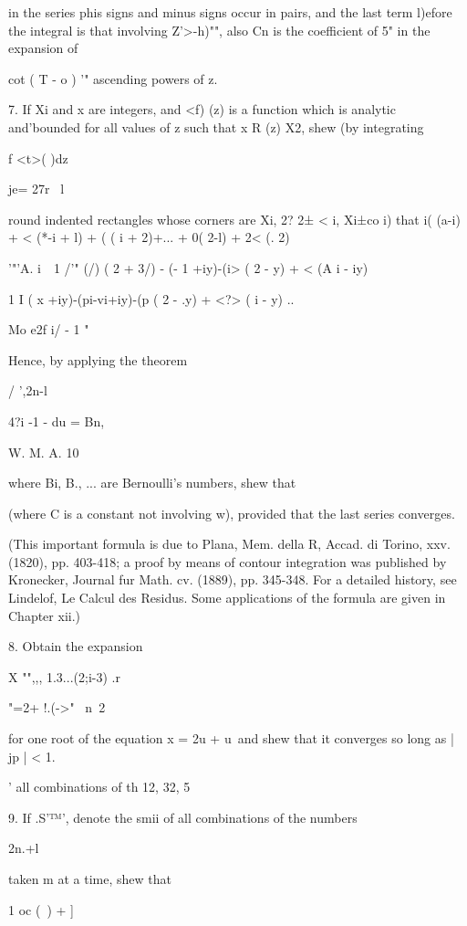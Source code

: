 {{in the series phis signs and minus signs occur in pairs, and the last
term l)efore the integral is that involving Z'>-h)"", also Cn is the
coefficient of 5" in the expansion of

cot ( T - o ) '" ascending powers of z. 

7. If Xi and x are integers, and <f) (z) is a function which is
analytic and'bounded for all values of z such that x R (z) X2, shew
(by integrating

f <t>( )dz

je= 27r \ l

round indented rectangles whose corners are Xi, 2? 2± < i, Xi±co i)
that i( (a-i) + < (*-i + l) + ( ( i + 2)+... + 0( 2-l) + 2< (. 2)

'"'A. i~\, 1 /'" (/) ( 2 + 3/) - (- 1 +iy)-(i> ( 2 - y) + < (A i -
iy)

1 I ( x +iy)-(pi-vi+iy)-(p ( 2 - .y) + <?> ( i - y) ..

Mo e2f i/ - 1  "

Hence, by applying the theorem

/ ',2n-l

4?i -1 - du = Bn,

W. M. A. 10

%
%

where Bi, B., ... are Bernoulli's numbers, shew that

(where C is a constant not involving w), provided that the last series
converges.

(This important formula is due to Plana, Mem. della R, Accad. di
Torino, xxv. (1820), pp. 403-418; a proof by means of contour
integration was published by Kronecker, Journal fur Math. cv. (1889),
pp. 345-348. For a detailed history, see Lindelof, Le Calcul des
Residus. Some applications of the formula are given in Chapter xii.)

8. Obtain the expansion

X "",,, 1.3...(2;i-3) .r

"=2+ !.(->"~ n\ 2

for one root of the equation x = 2u + u\ and shew that it converges so
long as | jp | < 1.

' all combinations of th 12, 32, 5%

9. If .S'™', denote the smii of all combinations of the numbers

2n.+l

taken m at a time, shew that

1 oc (\ ) + ]

}}
